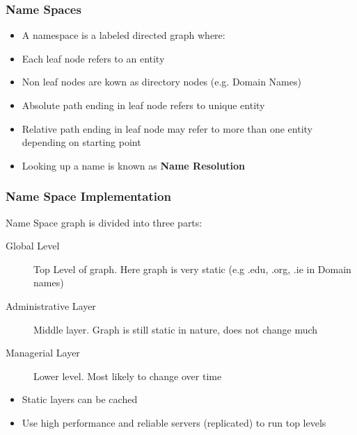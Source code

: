 \documentclass{beamer}
\begin{document}
    \begin{frame}
    	\frametitle{Name Spaces}
    	
    	\begin{itemize}
    		\item A namespace is a labeled directed graph where:
    		\item Each leaf node refers to an entity
    		\item Non leaf nodes are kown as directory nodes (e.g. Domain Names)
    		\item Absolute path ending in leaf node refers to unique entity
    		\item Relative path ending in leaf node may refer to more than one entity depending on starting point
    		\item Looking up a name is known as \textbf{Name Resolution}
    	\end{itemize}
    	
    \end{frame}
       
    \begin{frame}
    	\frametitle{Name Space Implementation}
    	Name Space graph is divided into three parts:
    	\begin{description}
    		\item[Global Level] Top Level of graph.  Here graph is very static (e.g .edu, .org, .ie in Domain names)
    		\item[Administrative Layer] Middle layer.  Graph is still static in nature, does not change much 
    		\item[Managerial Layer] Lower level. Most likely to change over time
    	\end{description}
    	\begin{itemize}
    		\item Static layers can be cached
    		\item Use high performance and reliable servers (replicated) to run top levels 
    	\end{itemize}
    \end{frame}
\end{document}
